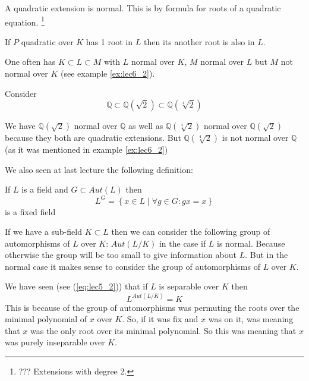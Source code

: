\begin{remark}
  A quadratic extension is normal. This is by formula for roots of a
  quadratic equation.
  \footnote {
    ??? Extensions with degree 2. 
  }

  If $P$ quadratic over $K$ has 1 root in $L$ then its another root is
  also in $L$.
\end{remark}

\begin{remark}
  One often has $K \subset L \subset M$ with $L$ normal over $K$, $M$
  normal over $L$ but $M$ not normal over $K$ (see example
  \ref{ex:lec6_2}). 
\end{remark}

\begin{example}
  Consider
  \[
  \mathbb{Q} \subset
  \mathbb{Q}\left(\sqrt{2}\right)
  \subset
  \mathbb{Q}\left(\sqrt[4]{2}\right)
  \]

  We have $\mathbb{Q}\left(\sqrt{2}\right)$ normal over $\mathbb{Q}$
  as well as $\mathbb{Q}\left(\sqrt[4]{2}\right)$ normal over
  $\mathbb{Q}\left(\sqrt{2}\right)$ because they both are quadratic
  extensions. But 
  $\mathbb{Q}\left(\sqrt[4]{2}\right)$ is not normal over $\mathbb{Q}$
  (as it was mentioned in example \ref{ex:lec6_2})
  \label{ex:lec6_2}
\end{example}

We also seen at last lecture the following definition:
\begin{definition}
  If $L$ is a field and $G \subset Aut\left(L\right)$ then
  \[
  L^G = \left\{
  x \in L \mid \forall g \in G: g x = x 
  \right\}
  \]  
  is a fixed field
  \label{def:fixedfield}
\end{definition}

If we have a sub-field $K \subset L$ then we can consider the
following group of automorphisms of $L$ over $K$:
$Aut\left(L/K\right)$ in the case if $L$ is normal.
Because otherwise the group will be too small to give information
about $L$. But in the normal case it makes sense to consider  
the group of automorphisms of $L$ over $K$.

We have seen (see (\ref{eq:lec5_2})) that if $L$ is separable over $K$
then 
\[
L^{Aut\left(L/K\right)} = K
\]
This is because of the group of automorphisms was permuting the roots
over the minimal polynomial of $x$ over $K$. So, if it was fix and $x$
was on it, was meaning that $x$ was the only root over its minimal
polynomial. So this was meaning that $x$ was purely inseparable over
$K$.  


